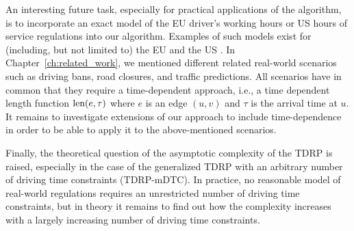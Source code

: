 An interesting future task, especially for practical applications of the algorithm, is to incorporate an exact model of the EU driver's working hours or US hours of service regulations into our algorithm. Examples of such models exist for (including, but not limited to) the EU \cite{goel:2009} and the US \cite{goel:2012}. In Chapter~\ref{ch:related_work}, we mentioned different related real-world scenarios such as driving bans, road closures, and traffic predictions. All scenarios have in common that they require a time-dependent approach, i.e., a time dependent length function $\operatorname{len}(e,\tau)$ where $e$ is an edge $(u,v)$ and $\tau$ is the arrival time at $u$. It remains to investigate extensions of our approach to include time-dependence in order to be able to apply it to the above-mentioned scenarios.

Finally, the theoretical question of the asymptotic complexity of the TDRP is raised, especially in the case of the generalized TDRP with an arbitrary number of driving time constraints (TDRP-mDTC). In practice, no reasonable model of real-world regulations requires an unrestricted number of driving time constraints, but in theory it remains to find out how the complexity increases with a largely increasing number of driving time constraints.


